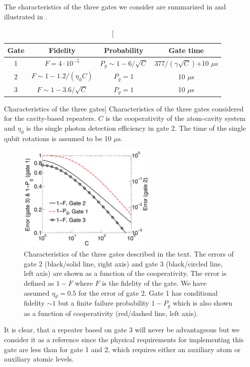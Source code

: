 The characteristics of the three gates we consider are summarized in
 and illustrated in .
\begin{table} 
\centering
\begin{tabular}{|c|c|c|c|}
\hline
Gate & Fidelity & Probability & Gate time  \\ \hline
1  & $F=4\cdot10^{-5}$ & $P_{g}\sim1-6/\sqrt{C}$ & $377/(\gamma\sqrt{C})$+10 $\mu$s\\ \hline
2 & $F\sim1-1.2/(\eta_{\mathrm{d}}C)$ & $P_{g}=1$ &10 $\mu$s  \\ \hline
3 & $F\sim1-3.6/\sqrt{C}$ & $P_{g}=1$ &10 $\mu$s \\ \hline
\end{tabular}
\caption
[Characteristics of the three gates]
{Characteristics of the three gates considered for the
cavity-based repeaters. $C$ is the cooperativity of the atom-cavity system and
$\eta_{\mathrm{d}}$ is the single photon detection efficiency in gate 2. The time
of the single qubit rotations is assumed to be 10 $\mu$s. }
\label{tab:table2}
\end{table}
\begin{figure} 
\centering
\includegraphics[width=0.6\textwidth]{./figs_Borregaard_PRA2015/figureX2}
\caption[CNOT gates comparison]{Characteristics of the three gates described in
the text. The errors of gate 2 (black/solid line, right axis) and gate 3
(black/circled line, left axis) are shown as a function of the cooperativity.
The error is defined as $1-F$ where $F$ is the fidelity of the gate. We have
assumed $\eta_{d}=0.5$ for the error of gate 2. Gate 1 has conditional fidelity
$\sim1$ but a finite failure probability $1-P_{g}$ which is also shown as a
function of cooperativity (red/dashed line, left axis).}
\label{fig:figureX2}
\end{figure} 
It is clear, that a repeater based on gate 3 will never be advantageous but we
consider it as a reference since the physical requirements for implementing this
gate are less than for gate 1 and 2, which requires either an auxiliary atom or
auxiliary atomic levels.

